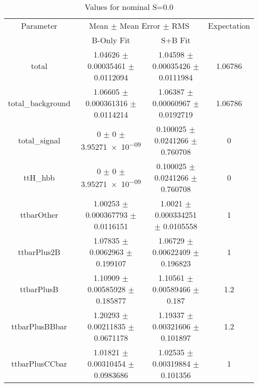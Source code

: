 \begin{table}
\centering
\caption{Values for nominal S=0.0}
\begin{tabular}{cccc}
\toprule
Parameter & \multicolumn{2}{c}{Mean $\pm$ Mean Error $\pm$ RMS} & Expectation\\
 & B-Only Fit & S+B Fit & \\
\midrule
total & \num{1.04626} $\pm$ \num{0.00035461} $\pm$ \num{0.0112094} & \num{1.04598} $\pm$ \num{0.00035426} $\pm$ \num{0.0111984} & \num{1.06786}\\
total\_background & \num{1.06605} $\pm$ \num{0.000361316} $\pm$ \num{0.0114214} & \num{1.06387} $\pm$ \num{0.00060967} $\pm$ \num{0.0192719} & \num{1.06786}\\
total\_signal & \num{0} $\pm$ \num{0} $\pm$ \num{3.95271e-09} & \num{0.100025} $\pm$ \num{0.0241266} $\pm$ \num{0.760708} & \num{0}\\
ttH\_hbb & \num{0} $\pm$ \num{0} $\pm$ \num{3.95271e-09} & \num{0.100025} $\pm$ \num{0.0241266} $\pm$ \num{0.760708} & \num{0}\\
ttbarOther & \num{1.00253} $\pm$ \num{0.000367793} $\pm$ \num{0.0116151} & \num{1.0021} $\pm$ \num{0.000334251} $\pm$ \num{0.0105558} & \num{1}\\
ttbarPlus2B & \num{1.07835} $\pm$ \num{0.0062963} $\pm$ \num{0.199107} & \num{1.06729} $\pm$ \num{0.00622409} $\pm$ \num{0.196823} & \num{1}\\
ttbarPlusB & \num{1.10909} $\pm$ \num{0.00585928} $\pm$ \num{0.185877} & \num{1.10561} $\pm$ \num{0.00589466} $\pm$ \num{0.187} & \num{1.2}\\
ttbarPlusBBbar & \num{1.20293} $\pm$ \num{0.00211835} $\pm$ \num{0.0671178} & \num{1.19337} $\pm$ \num{0.00321606} $\pm$ \num{0.101897} & \num{1.2}\\
ttbarPlusCCbar & \num{1.01821} $\pm$ \num{0.00310454} $\pm$ \num{0.0983686} & \num{1.02535} $\pm$ \num{0.00319884} $\pm$ \num{0.101356} & \num{1}\\
\bottomrule
\end{tabular}
\end{table}